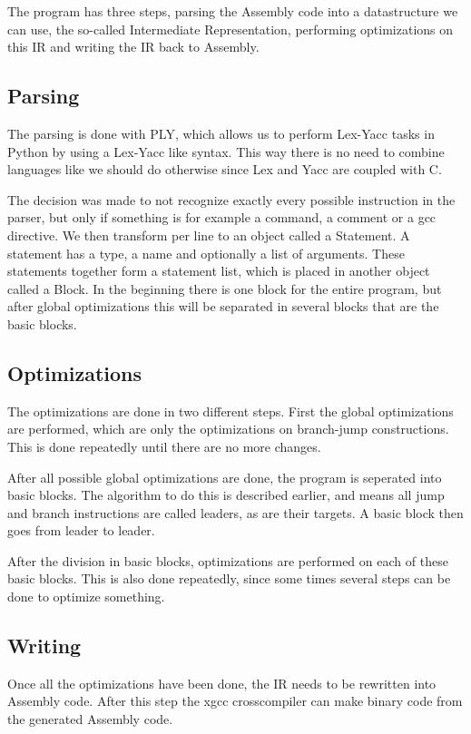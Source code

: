 \documentclass[10pt,a4paper]{article}
\begin{document}
The program has three steps, parsing the Assembly code into a datastructure we
can use, the so-called Intermediate Representation, performing optimizations on
this IR and writing the IR back to Assembly.

\subsection{Parsing}

The parsing is done with PLY, which allows us to perform Lex-Yacc tasks in
Python by using a Lex-Yacc like syntax. This way there is no need to combine
languages like we should do otherwise since Lex and Yacc are coupled with C.

The decision was made to not recognize exactly every possible instruction in
the parser, but only if something is for example a command, a comment or a gcc
directive. We then transform per line to an object called a Statement. A
statement has a type, a name and optionally a list of arguments. These
statements together form a statement list, which is placed in another object
called a Block. In the beginning there is one block for the entire program, but
after global optimizations this will be separated in several blocks that are
the basic blocks.

\subsection{Optimizations}

The optimizations are done in two different steps. First the global
optimizations are performed, which are only the optimizations on branch-jump
constructions. This is done repeatedly until there are no more changes.

After all possible global optimizations are done, the program is seperated into
basic blocks. The algorithm to do this is described earlier, and means all
jump and branch instructions are called leaders, as are their targets. A basic
block then goes from leader to leader.

After the division in basic blocks, optimizations are performed on each of
these basic blocks. This is also done repeatedly, since some times several
steps can be done to optimize something.

\subsection{Writing}

Once all the optimizations have been done, the IR needs to be rewritten into
Assembly code. After this step the xgcc crosscompiler can make binary code from
the generated Assembly code.
\end{document}
